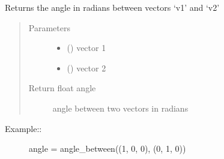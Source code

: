 \documentclass[letterpaper,10pt,english]{sphinxmanual}
\begin{document}
\begin{fulllineitems}
\label{\detokenize{_autosummary/analytics_core.analytics:analytics_core.analytics.analytics.angle_between}}
Returns the angle in radians between vectors ‘v1’ and ‘v2’
\begin{quote}\begin{description}
\item[{Parameters}] \leavevmode\begin{itemize}
\item {} 
 () \textendash{} vector 1

\item {} 
 () \textendash{} vector 2

\end{itemize}

\item[{Return float angle}] \leavevmode
angle between two vectors in radians

\end{description}\end{quote}
\begin{description}
\item[{Example::}] \leavevmode
angle = angle\_between((1, 0, 0), (0, 1, 0))

\end{description}

\end{fulllineitems}

\end{document}
